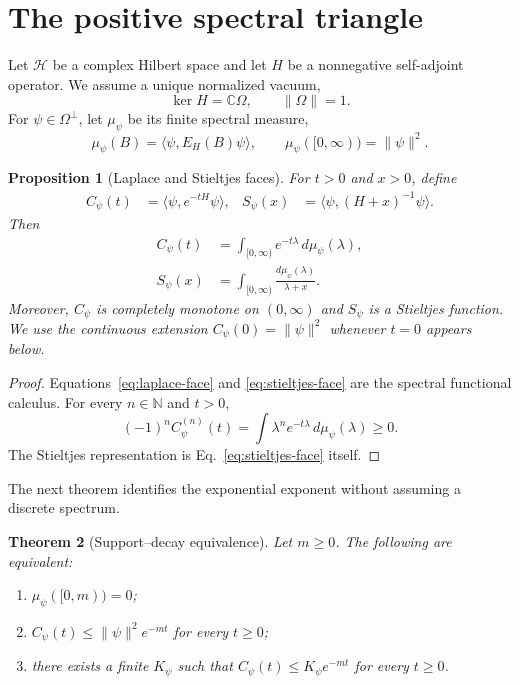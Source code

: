 \documentclass[11pt,a4paper]{article}
\newtheorem{theorem}{Theorem}[section]
\newtheorem{proposition}[theorem]{Proposition}
\theoremstyle{definition}
\theoremstyle{remark}
\newcommand{\C}{\mathbb C}
\newcommand{\N}{\mathbb N}
\begin{document}
\section{The positive spectral triangle}
\label{sec:triangle}

Let $\mathcal H$ be a complex Hilbert space and let $H$ be a nonnegative
self-adjoint operator.  We assume a unique normalized vacuum,
\[
  \ker H=\C\Omega,\qquad \|\Omega\|=1.
\]
For $\psi\in\Omega^\perp$, let $\mu_\psi$ be its finite spectral measure,
\[
  \mu_\psi(B)=\langle\psi,E_H(B)\psi\rangle,
  \qquad \mu_\psi([0,\infty))=\|\psi\|^2.
\]

\begin{proposition}[Laplace and Stieltjes faces]
\label{prop:faces}
For $t>0$ and $x>0$, define
\begin{align}
  C_\psi(t)&=\langle\psi,e^{-tH}\psi\rangle,
  &S_\psi(x)&=\langle\psi,(H+x)^{-1}\psi\rangle.
\end{align}
Then
\begin{align}
  C_\psi(t)&=\int_{[0,\infty)}e^{-t\lambda}\,d\mu_\psi(\lambda),
  \label{eq:laplace-face}\\
  S_\psi(x)&=\int_{[0,\infty)}\frac{d\mu_\psi(\lambda)}{\lambda+x}.
  \label{eq:stieltjes-face}
\end{align}
Moreover, $C_\psi$ is completely monotone on $(0,\infty)$ and $S_\psi$ is a
Stieltjes function.  We use the continuous extension
$C_\psi(0)=\|\psi\|^2$ whenever $t=0$ appears below.
\end{proposition}

\begin{proof}
Equations~\eqref{eq:laplace-face} and \eqref{eq:stieltjes-face} are the
spectral functional calculus.  For every $n\in\N$ and $t>0$,
\[
  (-1)^n C_\psi^{(n)}(t)
  =\int\lambda^n e^{-t\lambda}\,d\mu_\psi(\lambda)\geq0.
\]
The Stieltjes representation is Eq.~\eqref{eq:stieltjes-face} itself.
\end{proof}

The next theorem identifies the exponential exponent without assuming a
discrete spectrum.

\begin{theorem}[Support--decay equivalence]
\label{thm:support-decay}
Let $m\geq0$.  The following are equivalent:
\begin{enumerate}
  \item $\mu_\psi([0,m))=0$;
  \item $C_\psi(t)\leq\|\psi\|^2e^{-mt}$ for every $t\geq0$;
  \item there exists a finite $K_\psi$ such that
  $C_\psi(t)\leq K_\psi e^{-mt}$ for every $t\geq0$.
\end{enumerate}
\end{theorem}
\end{document}
